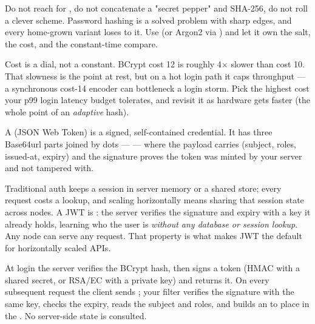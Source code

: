 \begin{secwarn}
Do not reach for , do not concatenate a "secret pepper" and SHA-256, do not roll a clever scheme. Password hashing is a solved problem with sharp edges, and every home-grown variant loses to it. Use  (or Argon2 via ) and let it own the salt, the cost, and the constant-time compare.
\end{secwarn}

\begin{perfnote}
Cost is a dial, not a constant. BCrypt cost 12 is roughly 4$\times$ slower than cost 10. That slowness is the point at rest, but on a hot login path it caps throughput --- a synchronous cost-14 encoder can bottleneck a login storm. Pick the highest cost your p99 login latency budget tolerates, and revisit it as hardware gets faster (the whole point of an \emph{adaptive} hash).
\end{perfnote}


 A  (JSON Web Token) is a signed, self-contained credential. It has three Base64url parts joined by dots ---  --- where the payload carries  (subject, roles, issued-at, expiry) and the signature proves the token was minted by your server and not tampered with.

 Traditional auth keeps a session in server memory or a shared store; every request costs a lookup, and scaling horizontally means sharing that session state across nodes. A JWT is : the server verifies the signature and expiry with a key it already holds, learning who the user is \emph{without any database or session lookup}. Any node can serve any request. That property is what makes JWT the default for horizontally scaled APIs.

 At login the server verifies the BCrypt hash, then signs a token (HMAC with a shared secret, or RSA/EC with a private key) and returns it. On every subsequent request the client sends ; your filter verifies the signature with the same key, checks the expiry, reads the subject and roles, and builds an  to place in the . No server-side state is consulted.

